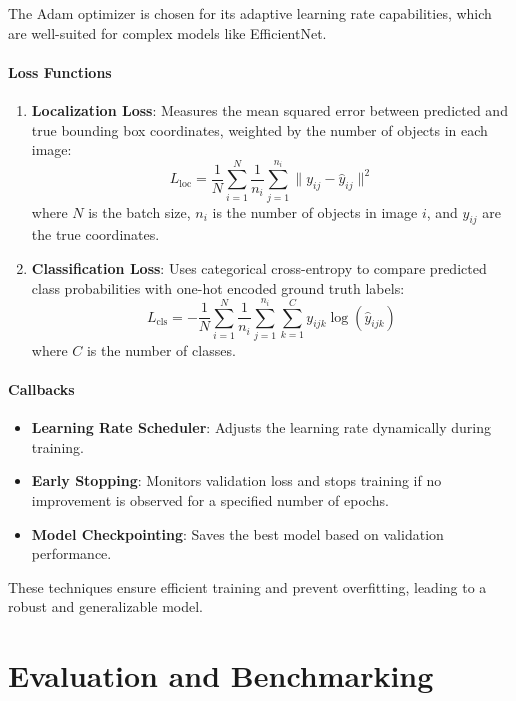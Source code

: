 The Adam optimizer is chosen for its adaptive learning rate capabilities, which are well-suited for complex models like EfficientNet.

\paragraph{Loss Functions}
\begin{enumerate}
    \item \textbf{Localization Loss}: Measures the mean squared error between predicted and true bounding box coordinates, weighted by the number of objects in each image:
    \[
    L_{\text{loc}} = \frac{1}{N} \sum_{i=1}^{N} \frac{1}{n_i} \sum_{j=1}^{n_i} \|y_{ij} - \hat{y}_{ij}\|^2
    \]
    where \(N\) is the batch size, \(n_i\) is the number of objects in image \(i\), and \(y_{ij}\) are the true coordinates.

    \item \textbf{Classification Loss}: Uses categorical cross-entropy to compare predicted class probabilities with one-hot encoded ground truth labels:
    \[
    L_{\text{cls}} = - \frac{1}{N} \sum_{i=1}^{N} \frac{1}{n_i} \sum_{j=1}^{n_i} \sum_{k=1}^{C} y_{ijk} \log(\hat{y}_{ijk})
    \]
    where \(C\) is the number of classes.
\end{enumerate}

\paragraph{Callbacks}
\begin{itemize}
    \item \textbf{Learning Rate Scheduler}: Adjusts the learning rate dynamically during training.
    \item \textbf{Early Stopping}: Monitors validation loss and stops training if no improvement is observed for a specified number of epochs.
    \item \textbf{Model Checkpointing}: Saves the best model based on validation performance.
\end{itemize}

These techniques ensure efficient training and prevent overfitting, leading to a robust and generalizable model.

\section{Evaluation and Benchmarking}

